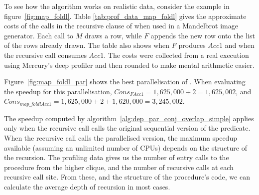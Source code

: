 
To see how the algorithm works on realistic data,
consider the \mapfoldl example in figure~\ref{fig:map_foldl}.
Table \ref{tab:prof_data_map_foldl} gives
the approximate costs of the calls in the recursive clause of \mapfoldl
when used in a Mandelbrot image generator.
Each call to $M$ draws a row,
while $F$ appends the new row
onto the list of the rows already drawn.
The table also shows when $F$ produces ${Acc1}$
and when the recursive call consumes ${Acc1}$.
The costs were collected from a real execution using Mercury's deep profiler
and then rounded to make mental arithmetic easier.

Figure~\ref{fig:map_foldl_par} shows the best parallelisation of
\mapfoldl.
When evaluating the speedup for this parallelisation,
${Cons}_{{F} {Acc1}} = 1,625,000 + 2 = 1,625,002$, and
${Cons}_{{map\_foldl} {Acc1}} = 1,625,000 + 2 + 1,620,000 = 3,245,002$.


The speedup computed by algorithm~\ref{alg:dep_par_conj_overlap_simple}
applies only when the recursive call
calls the original sequential version of the predicate.
When the recursive call calls the parallelised version,
the maximum speedup available (assuming an unlimited number of CPUs)
depends on the structure of the recursion.
The profiling data gives us 
the number of entry calls to the procedure from the higher clique,
and  the number of recursive calls at each recursive call site.
From these, and the structure of the procedure's code,
we can calculate the average depth of recursion in most cases.

